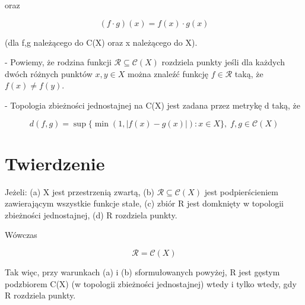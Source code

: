 \documentclass{article}
\begin{document}
oraz 

\begin{equation*}
	(f\cdot g)(x)=f(x)\cdot g(x)
\end{equation*}

(dla f,g należącego do C(X) oraz x należącego do X). \newline

- Powiemy, że rodzina funkcji \({\mathcal {R}}\subseteq {\mathcal {C}}(X)\) rozdziela punkty jeśli dla każdych dwóch różnych punktów $x,y\in X$ można znaleźć funkcję \(f\in {\mathcal {R}}\) taką, że $f(x)\neq f(y)$.

- Topologia zbieżności jednostajnej na C(X) jest zadana przez metrykę d taką, że

\[d(f,g)=\sup {\big \{}\min(1,|f(x)-g(x)|):x\in X{\big \}},\;f,g\in {\mathcal {C}}(X)\]

\section*{Twierdzenie}

Jeżeli:
    (a) X jest przestrzenią zwartą,
    (b) ${\mathcal {R}}\subseteq {\mathcal {C}}(X)$ jest podpierścieniem zawierającym wszystkie funkcje stałe,
    (c) zbiór R jest domknięty w topologii zbieżności jednostajnej,
    (d) R rozdziela punkty.

Wówczas

\begin{equation}
	{\mathcal {R}}={\mathcal {C}}(X)
\end{equation}

Tak więc, przy warunkach (a) i (b) sformułowanych powyżej,
R jest gęstym podzbiorem C(X) (w topologii zbieżności jednostajnej) wtedy i tylko wtedy, gdy R rozdziela punkty.
\end{document}
